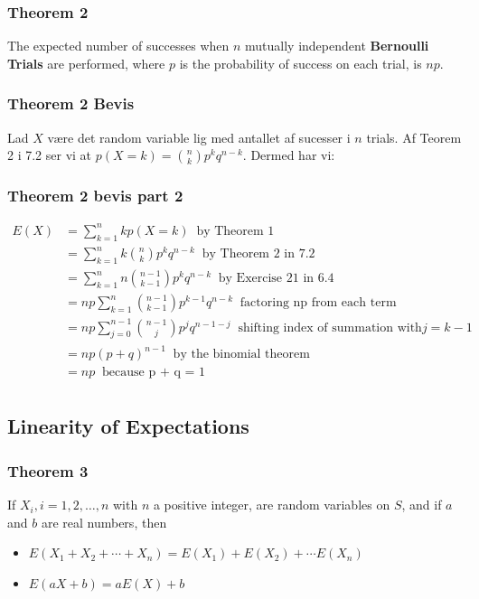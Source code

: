 \documentclass{beamer}
\begin{document}
\begin{frame}
  \frametitle{Theorem 2}
  \begin{theorem}
    The expected number of successes when $n$ mutually independent \textbf{Bernoulli Trials} are performed, where $p$ is the probability of success on each trial, is $np$.
  \end{theorem} 
\end{frame}

\begin{frame}
  \frametitle{Theorem 2 Bevis}
  Lad $X$  være det random variable lig med antallet af sucesser i $n$ trials. Af Teorem 2 i 7.2 ser vi at $p(X=k) = \binom{n}{k}p^{k}q^{n-k}$. Dermed har vi:

\end{frame}

\begin{frame}
  \frametitle{Theorem 2 bevis part 2}
  \begin{equation*}
    \begin{split}
      E(X) &= \sum_{k=1}^{n}kp(X=k) \;\; \text{by Theorem 1}\\
           &= \sum_{k=1}^{n}k \binom{n}{k}p^{k}q^{n-k} \;\; \text{by Theorem 2 in 7.2}\\
           &= \sum_{k=1}^{n} n \binom{n-1}{k-1}p^{k} q^{n-k} \; \; \text{by Exercise 21 in 6.4}\\
           &= np\sum_{k=1}^{n} \binom{n-1}{k-1}p^{k-1}q^{n-k} \; \; \text{factoring np from each term} \\
           &= np \sum_{j=0}^{n-1} \binom{n-1}{j}p^{j}q^{n-1-j}\;\; \text{shifting index of summation with} j = k - 1\\
           &= np(p+q)^{n-1} \;\; \text{by the binomial theorem}\\
           &= np \;\; \text{because p + q = 1}\\
    \end{split}
  \end{equation*}
\end{frame}

\subsection{Linearity of Expectations}
\label{subsec:linexp}

\begin{frame}
  \frametitle{Theorem 3}
  \begin{theorem}
    If $X_i, i = 1, 2, \ldots, n$ with $n$ a positive integer, are random variables on $S$, and if $a$ and $b$ are real numbers, then
    \begin{itemize}
    \item $E(X_{1}+X_{2}+ \cdots + X_{n}) = E(X_{1})+ E(X_{2})+ \cdots E(X_{n})$
    \item $E(aX+b) = aE(X)+b$
    \end{itemize}
  \end{theorem}
\end{frame}
\end{document}
